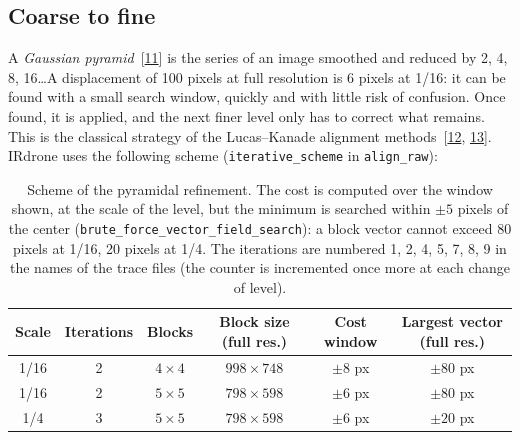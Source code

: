 \documentclass[a4paper,11pt]{report}
\begin{document}
\subsection{Coarse to fine}
A \emph{Gaussian pyramid}~[\hyperref[ann_burt]{11}] is the series of an image smoothed and reduced by 2, 4, 8, 16\ldots A displacement of 100 pixels at full resolution is 6 pixels at 1/16: it can be found with a small search window, quickly and with little risk of confusion. Once found, it is applied, and the next finer level only has to correct what remains. This is the classical strategy of the Lucas--Kanade alignment methods~[\hyperref[ann_lucas]{12}, \hyperref[ann_baker]{13}]. IRdrone uses the following scheme (\texttt{iterative\_scheme} in \texttt{align\_raw}):

\begin{table}[htbp]\centering
\begin{tabular}{@{}cccccc@{}}
\hline
\textbf{Scale} & \textbf{Iterations} & \textbf{Blocks} & \textbf{Block size (full res.)} & \textbf{Cost window} & \textbf{Largest vector (full res.)} \\ \hline
1/16 & 2 & $4 \times 4$ & $998 \times 748$ & $\pm 8$ px & $\pm 80$ px \\
1/16 & 2 & $5 \times 5$ & $798 \times 598$ & $\pm 6$ px & $\pm 80$ px \\
1/4 & 3 & $5 \times 5$ & $798 \times 598$ & $\pm 6$ px & $\pm 20$ px \\ \hline
\end{tabular}
\caption{Scheme of the pyramidal refinement. The cost is computed over the window shown, at the scale of the level, but the minimum is searched within $\pm 5$ pixels of the center (\texttt{brute\_force\_vector\_field\_search}): a block vector cannot exceed 80 pixels at 1/16, 20 pixels at 1/4. The iterations are numbered 1, 2, 4, 5, 7, 8, 9 in the names of the trace files (the counter is incremented once more at each change of level).}
\label{tab:ann_pyramid}
\end{table}
\end{document}
